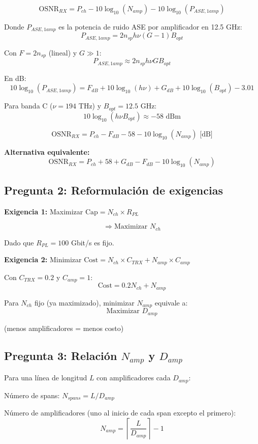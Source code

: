 \documentclass[a4paper,10pt]{article}
\begin{document}
$$\boxed{\text{OSNR}_{RX} = P_{ch} - 10\log_{10}(N_{amp}) - 10\log_{10}(P_{ASE,1amp})}$$

Donde $P_{ASE,1amp}$ es la potencia de ruido ASE por amplificador en 12.5 GHz:
$$P_{ASE,1amp} = 2 n_{sp} h \nu (G-1) B_{opt}$$

Con $F = 2n_{sp}$ (lineal) y $G \gg 1$:
$$P_{ASE,1amp} \approx 2 n_{sp} h \nu G B_{opt}$$

En dB:
$$10\log_{10}(P_{ASE,1amp}) = F_{dB} + 10\log_{10}(h\nu) + G_{dB} + 10\log_{10}(B_{opt}) - 3.01$$

Para banda C ($\nu = 194$ THz) y $B_{opt} = 12.5$ GHz:
$$10\log_{10}(h\nu B_{opt}) \approx -58 \text{ dBm}$$

$$\boxed{\text{OSNR}_{RX} = P_{ch} - F_{dB} - 58 - 10\log_{10}(N_{amp}) \text{ [dB]}}$$

\textbf{Alternativa equivalente:}
$$\boxed{\text{OSNR}_{RX} = P_{ch} + 58 + G_{dB} - F_{dB} - 10\log_{10}(N_{amp})}$$

\subsection{Pregunta 2: Reformulación de exigencias}

\textbf{Exigencia 1:} Maximizar $\text{Cap} = N_{ch} \times R_{PL}$

$$\Rightarrow \boxed{\text{Maximizar } N_{ch}}$$

Dado que $R_{PL} = 100$ Gbit/s es fijo.

\textbf{Exigencia 2:} Minimizar $\text{Cost} = N_{ch} \times C_{TRX} + N_{amp} \times C_{amp}$

Con $C_{TRX} = 0.2$ y $C_{amp} = 1$:
$$\text{Cost} = 0.2 N_{ch} + N_{amp}$$

Para $N_{ch}$ fijo (ya maximizado), minimizar $N_{amp}$ equivale a:
$$\boxed{\text{Maximizar } D_{amp}}$$

(menos amplificadores = menos costo)

\subsection{Pregunta 3: Relación $N_{amp}$ y $D_{amp}$}

Para una línea de longitud $L$ con amplificadores cada $D_{amp}$:

Número de spans: $N_{spans} = L / D_{amp}$

Número de amplificadores (uno al inicio de cada span excepto el primero):
$$\boxed{N_{amp} = \left\lceil \frac{L}{D_{amp}} \right\rceil - 1}$$
\end{document}
